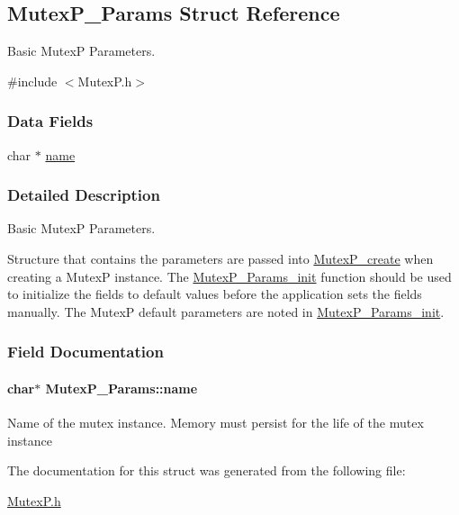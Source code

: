\subsection{Mutex\+P\+\_\+\+Params Struct Reference}
\label{struct_mutex_p___params}


Basic Mutex\+P Parameters.  




{\ttfamily \#include $<$Mutex\+P.\+h$>$}

\subsubsection*{Data Fields}
\begin{DoxyCompactItemize}
\item 
char $\ast$ \hyperlink{struct_mutex_p___params_a178c9aba6ef32c192a260d39de7c6c8f}{name}
\end{DoxyCompactItemize}


\subsubsection{Detailed Description}
Basic Mutex\+P Parameters. 

Structure that contains the parameters are passed into \hyperlink{_mutex_p_8h_af05d5dc3cadfca5a06572ef7e9ead652}{Mutex\+P\+\_\+create} when creating a Mutex\+P instance. The \hyperlink{_mutex_p_8h_a023e95c8429aa68dcbb98adacb1ac381}{Mutex\+P\+\_\+\+Params\+\_\+init} function should be used to initialize the fields to default values before the application sets the fields manually. The Mutex\+P default parameters are noted in \hyperlink{_mutex_p_8h_a023e95c8429aa68dcbb98adacb1ac381}{Mutex\+P\+\_\+\+Params\+\_\+init}. 

\subsubsection{Field Documentation}
\paragraph[{name}]{\setlength{\rightskip}{0pt plus 5cm}char$\ast$ Mutex\+P\+\_\+\+Params\+::name}\label{struct_mutex_p___params_a178c9aba6ef32c192a260d39de7c6c8f}
Name of the mutex instance. Memory must persist for the life of the mutex instance 

The documentation for this struct was generated from the following file\+:\begin{DoxyCompactItemize}
\item 
\hyperlink{_mutex_p_8h}{Mutex\+P.\+h}\end{DoxyCompactItemize}
